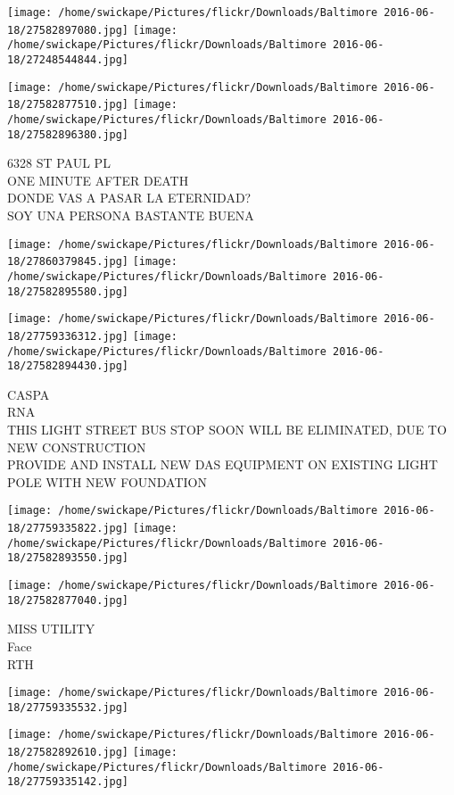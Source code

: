 \documentclass[10pt,letterpaper]{article}
\begin{document}
\texttt{[image: /home/swickape/Pictures/flickr/Downloads/Baltimore 2016-06-18/27582897080.jpg]}
\texttt{[image: /home/swickape/Pictures/flickr/Downloads/Baltimore 2016-06-18/27248544844.jpg]}

\texttt{[image: /home/swickape/Pictures/flickr/Downloads/Baltimore 2016-06-18/27582877510.jpg]}
\texttt{[image: /home/swickape/Pictures/flickr/Downloads/Baltimore 2016-06-18/27582896380.jpg]}

6328 ST PAUL PL\\
ONE MINUTE AFTER DEATH\\
DONDE VAS A PASAR LA ETERNIDAD?\\
SOY UNA PERSONA BASTANTE BUENA\\
\pagebreak

\texttt{[image: /home/swickape/Pictures/flickr/Downloads/Baltimore 2016-06-18/27860379845.jpg]}
\texttt{[image: /home/swickape/Pictures/flickr/Downloads/Baltimore 2016-06-18/27582895580.jpg]}

\texttt{[image: /home/swickape/Pictures/flickr/Downloads/Baltimore 2016-06-18/27759336312.jpg]}
\texttt{[image: /home/swickape/Pictures/flickr/Downloads/Baltimore 2016-06-18/27582894430.jpg]}

CASPA\\
RNA\\
THIS LIGHT STREET BUS STOP SOON WILL BE ELIMINATED, DUE TO NEW CONSTRUCTION\\
PROVIDE AND INSTALL NEW DAS EQUIPMENT ON EXISTING LIGHT POLE WITH NEW FOUNDATION\\
\pagebreak

\texttt{[image: /home/swickape/Pictures/flickr/Downloads/Baltimore 2016-06-18/27759335822.jpg]}
\texttt{[image: /home/swickape/Pictures/flickr/Downloads/Baltimore 2016-06-18/27582893550.jpg]}

\texttt{[image: /home/swickape/Pictures/flickr/Downloads/Baltimore 2016-06-18/27582877040.jpg]}

MISS UTILITY\\
Face\\
RTH\\
\pagebreak

\texttt{[image: /home/swickape/Pictures/flickr/Downloads/Baltimore 2016-06-18/27759335532.jpg]}

\vspace{0.25in}
\texttt{[image: /home/swickape/Pictures/flickr/Downloads/Baltimore 2016-06-18/27582892610.jpg]}
\texttt{[image: /home/swickape/Pictures/flickr/Downloads/Baltimore 2016-06-18/27759335142.jpg]}
\end{document}
